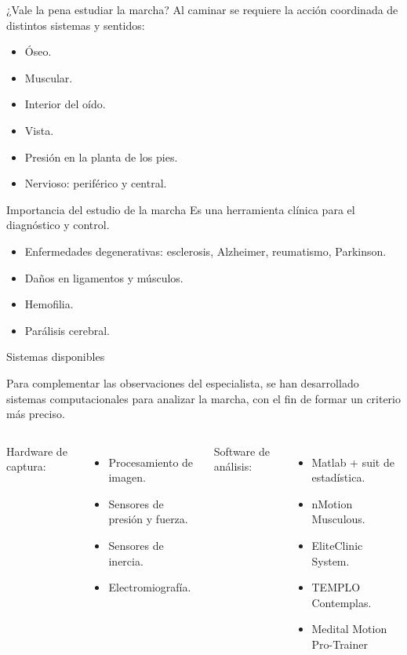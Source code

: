 \documentclass[aspectratio=169,spanish]{beamer} %
\begin{document}
\begin{frame}{¿Vale la pena estudiar la marcha?}
    Al caminar se requiere la acción coordinada de distintos sistemas y sentidos:
    \begin{itemize}
        \item Óseo.
        \item Muscular.
        \item Interior del oído.
        \item Vista.
        \item Presión en la planta de los pies.
        \item Nervioso: periférico y central. 
    \end{itemize}
\end{frame}

\begin{frame}{Importancia del estudio de la marcha}
    Es una herramienta clínica para el diagnóstico y control.
    \begin{itemize}
        \item Enfermedades degenerativas: esclerosis, Alzheimer, reumatismo, Parkinson. 
        \item Daños en ligamentos y músculos.
        \item Hemofilia.
        \item Parálisis cerebral. 
    \end{itemize}
\end{frame}

\begin{frame}{Sistemas disponibles}
    \begin{block}{}
        Para complementar las observaciones del especialista, se han desarrollado sistemas computacionales para analizar la marcha, con el fin de formar un criterio más preciso. 
    \end{block}
    \begin{columns}
        Hardware de captura:
        \begin{itemize}
            \item Procesamiento de imagen.
            \item Sensores de presión y fuerza.
            \item Sensores de inercia.
            \item Electromiografía.
        \end{itemize}
        Software de análisis:
        \begin{itemize}
            \item Matlab + suit de estadística.
            \item nMotion Musculous.
            \item EliteClinic System.
            \item TEMPLO Contemplas.
            \item Medital Motion Pro-Trainer
        \end{itemize}
    \end{columns}
\end{frame}
\end{document}
